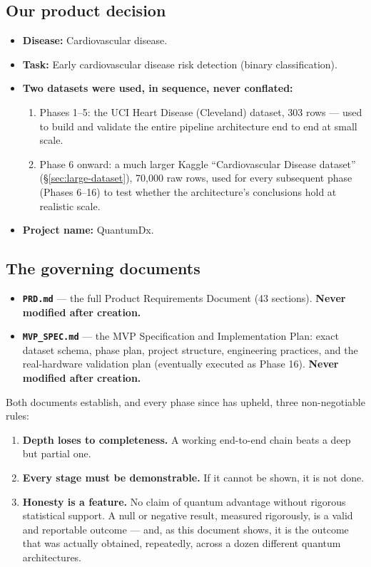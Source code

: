 \documentclass[11pt,a4paper]{article}
\newcommand{\code}[1]{\texttt{\small #1}}
\begin{document}
\subsection{Our product decision}

\begin{itemize}[leftmargin=1.4em]
  \item \textbf{Disease:} Cardiovascular disease.
  \item \textbf{Task:} Early cardiovascular disease risk detection (binary classification).
  \item \textbf{Two datasets were used, in sequence, never conflated:}
  \begin{enumerate}[leftmargin=1.4em]
    \item Phases 1--5: the UCI Heart Disease (Cleveland) dataset, 303 rows --- used to build and validate the entire pipeline architecture end to end at small scale.
    \item Phase 6 onward: a much larger Kaggle ``Cardiovascular Disease dataset'' (\S\ref{sec:large-dataset}), 70,000 raw rows, used for every subsequent phase (Phases 6--16) to test whether the architecture's conclusions hold at realistic scale.
  \end{enumerate}
  \item \textbf{Project name:} QuantumDx.
\end{itemize}

\subsection{The governing documents}

\begin{itemize}[leftmargin=1.4em]
  \item \textbf{\code{PRD.md}} --- the full Product Requirements Document (43 sections). \textbf{Never modified after creation.}
  \item \textbf{\code{MVP\_SPEC.md}} --- the MVP Specification and Implementation Plan: exact dataset schema, phase plan, project structure, engineering practices, and the real-hardware validation plan (eventually executed as Phase 16). \textbf{Never modified after creation.}
\end{itemize}

Both documents establish, and every phase since has upheld, three non-negotiable rules:
\begin{enumerate}[leftmargin=1.4em]
  \item \textbf{Depth loses to completeness.} A working end-to-end chain beats a deep but partial one.
  \item \textbf{Every stage must be demonstrable.} If it cannot be shown, it is not done.
  \item \textbf{Honesty is a feature.} No claim of quantum advantage without rigorous statistical support. A null or negative result, measured rigorously, is a valid and reportable outcome --- and, as this document shows, it is the outcome that was actually obtained, repeatedly, across a dozen different quantum architectures.
\end{enumerate}
\end{document}
